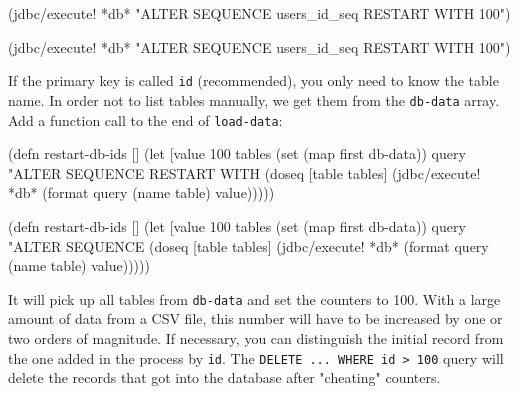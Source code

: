 \ifx\DEVICETYPE\MOBILE

\begin{english}
  \begin{clojure}
(jdbc/execute! *db*
  "ALTER SEQUENCE users_id_seq
   RESTART WITH 100")
  \end{clojure}
\end{english}

\else

\begin{english}
  \begin{clojure}
(jdbc/execute! *db*
  "ALTER SEQUENCE users_id_seq RESTART WITH 100")
  \end{clojure}
\end{english}

\fi

If the primary key is called \verb|id| (recommended), you only need to know the table name. In order not to list tables manually, we get them from the \verb|db-data| array. Add a function call to the end of \verb|load-data|:


\ifx\DEVICETYPE\MOBILE

\begin{english}
  \begin{clojure}
(defn restart-db-ids []
  (let [value 100
        tables (set (map first db-data))
        query "ALTER SEQUENCE %
               RESTART WITH %
    (doseq [table tables]
      (jdbc/execute! *db*
        (format query
          (name table) value)))))
  \end{clojure}
\end{english}

\else

\begin{english}
  \begin{clojure}
(defn restart-db-ids []
  (let [value 100
        tables (set (map first db-data))
        query "ALTER SEQUENCE %
    (doseq [table tables]
      (jdbc/execute! *db* (format query (name table) value)))))
  \end{clojure}
\end{english}

\fi

It will pick up all tables from \verb|db-data| and set the counters to 100. With a large amount of data from a CSV file, this number will have to be increased by one or two orders of magnitude. If necessary, you can distinguish the initial record from the one added in the process by \verb|id|. The \verb|DELETE ... WHERE id > 100| query will delete the records that got into the database after "cheating" counters.


